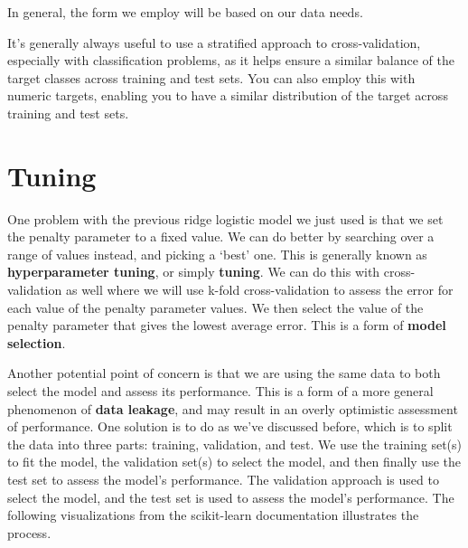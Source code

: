 \documentclass[
  letterpaper,
]{krantz}
\begin{document}
In general, the form we employ will be based on our data needs.

\begin{tcolorbox}[enhanced jigsaw, colback=white, toprule=.15mm, colframe=quarto-callout-tip-color-frame, breakable, leftrule=.75mm, bottomrule=.15mm, opacityback=0, left=2mm, rightrule=.15mm, arc=.35mm]
\begin{minipage}[t]{5.5mm}
\textcolor{quarto-callout-tip-color}{\faLightbulb}
\end{minipage}%
\begin{minipage}[t]{\textwidth - 5.5mm}

It's generally always useful to use a stratified approach to
cross-validation, especially with classification problems, as it helps
ensure a similar balance of the target classes across training and test
sets. You can also employ this with numeric targets, enabling you to
have a similar distribution of the target across training and test sets.

\end{minipage}%
\end{tcolorbox}

\section{Tuning}\label{tuning}

One problem with the previous ridge logistic model we just used is that
we set the penalty parameter to a fixed value. We can do better by
searching over a range of values instead, and picking a `best' one. This
is generally known as \textbf{hyperparameter tuning}, or simply
\textbf{tuning}. We can do this with cross-validation as well where we
will use k-fold cross-validation to assess the error for each value of
the penalty parameter values. We then select the value of the penalty
parameter that gives the lowest average error. This is a form of
\textbf{model selection}.

Another potential point of concern is that we are using the same data to
both select the model and assess its performance. This is a form of a
more general phenomenon of \textbf{data leakage}, and may result in an
overly optimistic assessment of performance. One solution is to do as
we've discussed before, which is to split the data into three parts:
training, validation, and test. We use the training set(s) to fit the
model, the validation set(s) to select the model, and then finally use
the test set to assess the model's performance. The validation approach
is used to select the model, and the test set is used to assess the
model's performance. The following visualizations from the scikit-learn
documentation illustrates the process.
\end{document}
